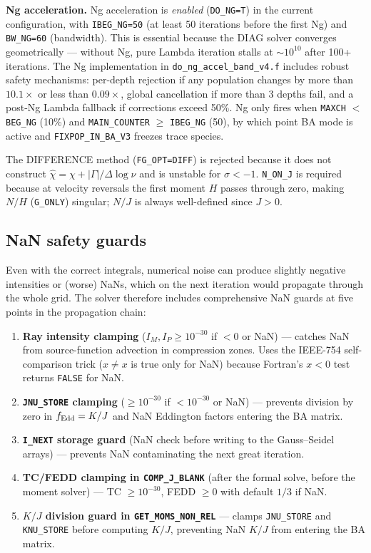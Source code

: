 \documentclass[11pt]{article}
\begin{document}
\textbf{Ng acceleration.}\quad
Ng acceleration is \emph{enabled} (\texttt{DO\_NG=T}) in the current
configuration, with \texttt{IBEG\_NG=50} (at least 50 iterations before
the first Ng) and \texttt{BW\_NG=60} (bandwidth).  This is essential
because the DIAG solver converges geometrically --- without Ng, pure
Lambda iteration stalls at $\sim 10^{10}$ after 100+ iterations.  The
Ng implementation in \texttt{do\_ng\_accel\_band\_v4.f} includes robust
safety mechanisms: per-depth rejection if any population changes by more
than $10.1\times$ or less than $0.09\times$, global cancellation if more
than 3 depths fail, and a post-Ng Lambda fallback if corrections exceed
50\%.  Ng only fires when \texttt{MAXCH} $<$ \texttt{BEG\_NG} (10\%) and
\texttt{MAIN\_COUNTER} $\ge$ \texttt{IBEG\_NG} (50), by which point BA
mode is active and \texttt{FIXPOP\_IN\_BA\_V3} freezes trace species.

The DIFFERENCE method (\texttt{FG\_OPT=DIFF}) is rejected because it
does not construct $\hat\chi = \chi + |\Gamma|/\Delta\log\nu$ and is
unstable for $\sigma < -1$.  \texttt{N\_ON\_J} is required because at
velocity reversals the first moment $H$ passes through zero, making
$N/H$ (\texttt{G\_ONLY}) singular; $N/J$ is always well-defined since
$J > 0$.

\subsection{NaN safety guards}

Even with the correct integrals, numerical noise can produce slightly
negative intensities or (worse) NaNs, which on the next iteration would
propagate through the whole grid.  The solver therefore includes
comprehensive NaN guards at five points in the propagation chain:

\begin{enumerate}[nosep]
  \item \textbf{Ray intensity clamping} ($I_M, I_P \ge 10^{-30}$ if
        $< 0$ or NaN) --- catches NaN from source-function advection in
        compression zones.  Uses the IEEE-754 self-comparison trick
        ($x \neq x$ is true only for NaN) because Fortran's
        $x < 0$ test returns \texttt{FALSE} for NaN.
  \item \textbf{\texttt{JNU\_STORE} clamping} ($\ge 10^{-30}$ if
        $< 10^{-30}$ or NaN) --- prevents division by zero in
        $f_{\rm Edd} = K/J$ and NaN Eddington factors entering the BA
        matrix.
  \item \textbf{\texttt{I\_NEXT} storage guard} (NaN check before
        writing to the Gauss--Seidel arrays) --- prevents NaN
        contaminating the next great iteration.
  \item \textbf{TC/FEDD clamping in \texttt{COMP\_J\_BLANK}} (after the
        formal solve, before the moment solver) --- TC
        $\ge 10^{-30}$, FEDD $\ge 0$ with default $1/3$ if NaN.
  \item \textbf{$K/J$ division guard in \texttt{GET\_MOMS\_NON\_REL}} ---
        clamps \texttt{JNU\_STORE} and \texttt{KNU\_STORE} before
        computing $K/J$, preventing NaN $K/J$ from entering the BA
        matrix.
\end{enumerate}
\end{document}
